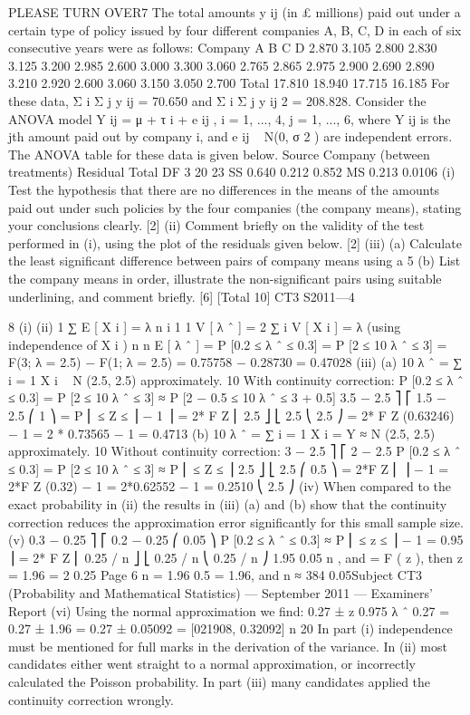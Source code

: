 
PLEASE TURN OVER7
The total amounts y ij (in £ millions) paid out under a certain type of policy issued by
four different companies A, B, C, D in each of six consecutive years were as follows:
Company
A
B
C
D
2.870
3.105
2.800
2.830
3.125
3.200
2.985
2.600
3.000
3.300
3.060
2.765
2.865
2.975
2.900
2.690
2.890
3.210
2.920
2.600
3.060
3.150
3.050
2.700
Total
17.810
18.940
17.715
16.185
For these data, Σ i Σ j y ij = 70.650 and Σ i Σ j y ij 2 = 208.828.
Consider the ANOVA model Y ij = μ + τ i + e ij , i = 1, ..., 4, j = 1, ..., 6, where Y ij is the
jth amount paid out by company i, and e ij ~ N(0, σ 2 ) are independent errors.
The ANOVA table for these data is given below.
Source
Company (between treatments)
Residual
Total
DF
3
20
23
SS
0.640
0.212
0.852
MS
0.213
0.0106
(i) Test the hypothesis that there are no differences in the means of the amounts
paid out under such policies by the four companies (the company means),
stating your conclusions clearly.
[2]
(ii) Comment briefly on the validity of the test performed in (i), using the plot of
the residuals given below.
[2]
(iii) (a)
Calculate the least significant difference between pairs of company
means using a 5%
(b)
List the company means in order, illustrate the non-significant pairs
using suitable underlining, and comment briefly.
[6]
[Total 10]
CT3 S2011—4

8
(i)
(ii)
1
∑ E [ X i ] = λ
n i
1
1
V [ λ ˆ ] = 2 ∑ i V [ X i ] = λ (using independence of X i )
n
n
E [ λ ˆ ] =
P [0.2 ≤ λ ˆ ≤ 0.3] = P [2 ≤ 10 λ ˆ ≤ 3]
= F(3; λ = 2.5) − F(1; λ = 2.5) = 0.75758 − 0.28730 = 0.47028
(iii)
(a)
10 λ ˆ = ∑ i = 1 X i ~ N (2.5, 2.5) approximately.
10
With continuity correction:
P [0.2 ≤ λ ˆ ≤ 0.3] = P [2 ≤ 10 λ ˆ ≤ 3] ≈ P [2 − 0.5 ≤ 10 λ ˆ ≤ 3 + 0.5]
3.5 − 2.5 ⎤
⎡ 1.5 − 2.5
⎛ 1 ⎞
= P ⎢
≤ Z ≤
⎟ − 1
⎥ = 2* F Z ⎜
2.5 ⎦
⎣ 2.5
⎝ 2.5 ⎠
= 2* F Z (0.63246) − 1 = 2 * 0.73565 − 1 = 0.4713
(b)
10 λ ˆ = ∑ i = 1 X i = Y ≈ N (2.5, 2.5) approximately.
10
Without continuity correction:
3 − 2.5 ⎤
⎡ 2 − 2.5
P [0.2 ≤ λ ˆ ≤ 0.3] = P [2 ≤ 10 λ ˆ ≤ 3] ≈ P ⎢
≤ Z ≤
⎥
2.5 ⎦
⎣ 2.5
⎛ 0.5 ⎞
= 2*F Z ⎜
⎟ − 1 = 2*F Z (0.32) − 1 = 2*0.62552 − 1 = 0.2510
⎝ 2.5 ⎠
(iv)
When compared to the exact probability in (ii) the results in (iii) (a) and (b)
show that the continuity correction reduces the approximation error
significantly for this small sample size.
(v)
0.3 − 0.25 ⎤
⎡ 0.2 − 0.25
⎛ 0.05 ⎞
P [0.2 ≤ λ ˆ ≤ 0.3] ≈ P ⎢
≤ z ≤
⎟ − 1 = 0.95
⎥ = 2* F Z ⎜
0.25 / n ⎦
⎣ 0.25 / n
⎝ 0.25 / n ⎠
1.95
0.05
n , and
= F ( z ), then z = 1.96 =
2
0.25
Page 6
n = 1.96
0.5
= 1.96, and n ≈ 384
0.05Subject CT3 (Probability and Mathematical Statistics) — September 2011 — Examiners’ Report
(vi)
Using the normal approximation we find:
0.27 ± z 0.975
λ ˆ
0.27
= 0.27 ± 1.96
= 0.27 ± 0.05092 = [021908, 0.32092]
n
20
In part (i) independence must be mentioned for full marks in the derivation of the variance. In
(ii) most candidates either went straight to a normal approximation, or incorrectly calculated
the Poisson probability. In part (iii) many candidates applied the continuity correction
wrongly.
